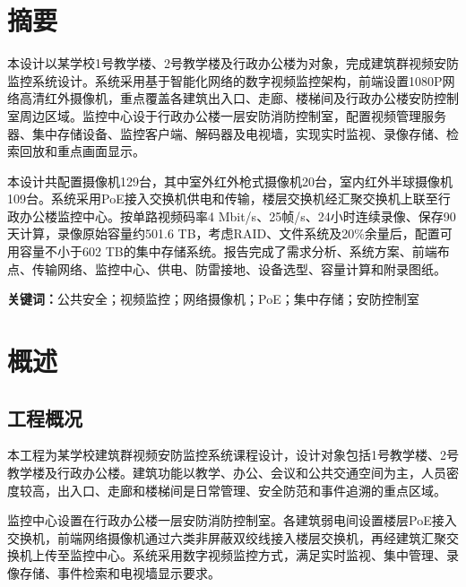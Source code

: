 \documentclass[UTF8,zihao=-4,openany]{ctexrep}
\begin{document}


\setcounter{page}{1}
\chapter*{摘\quad 要}
本设计以某学校1号教学楼、2号教学楼及行政办公楼为对象，完成建筑群视频安防监控系统设计。系统采用基于智能化网络的数字视频监控架构，前端设置1080P网络高清红外摄像机，重点覆盖各建筑出入口、走廊、楼梯间及行政办公楼安防控制室周边区域。监控中心设于行政办公楼一层安防消防控制室，配置视频管理服务器、集中存储设备、监控客户端、解码器及电视墙，实现实时监视、录像存储、检索回放和重点画面显示。

本设计共配置摄像机129台，其中室外红外枪式摄像机20台，室内红外半球摄像机109台。系统采用PoE接入交换机供电和传输，楼层交换机经汇聚交换机上联至行政办公楼监控中心。按单路视频码率4 Mbit/s、25帧/s、24小时连续录像、保存90天计算，录像原始容量约501.6 TB，考虑RAID、文件系统及20\%余量后，配置可用容量不小于602 TB的集中存储系统。报告完成了需求分析、系统方案、前端布点、传输网络、监控中心、供电、防雷接地、设备选型、容量计算和附录图纸。

\noindent\textbf{关键词：}公共安全；视频监控；网络摄像机；PoE；集中存储；安防控制室

\clearpage
\tableofcontents
\clearpage

\chapter{概述}
\section{工程概况}
本工程为某学校建筑群视频安防监控系统课程设计，设计对象包括1号教学楼、2号教学楼及行政办公楼。建筑功能以教学、办公、会议和公共交通空间为主，人员密度较高，出入口、走廊和楼梯间是日常管理、安全防范和事件追溯的重点区域。

监控中心设置在行政办公楼一层安防消防控制室。各建筑弱电间设置楼层PoE接入交换机，前端网络摄像机通过六类非屏蔽双绞线接入楼层交换机，再经建筑汇聚交换机上传至监控中心。系统采用数字视频监控方式，满足实时监视、集中管理、录像存储、事件检索和电视墙显示要求。
\end{document}
